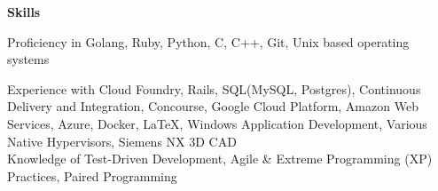 \documentclass[10pt,a4papaer]{article}
\begin{document}
{		\setlength{\leftskip}{0pt}
		
		{\noindent\textbf{Skills}}\vspace*{-20px}\\
		
		\noindent\makebox[\linewidth]{\rule{\textwidth}{1.3pt}}
		
		Proficiency in Golang, Ruby, Python, C, C++, Git, Unix based operating systems\\
		
		\setlength{\leftskip}{15pt}
		
		{\noindent Experience with Cloud Foundry, Rails, SQL(MySQL, Postgres), Continuous Delivery and Integration, Concourse, Google Cloud Platform, Amazon Web Services, Azure, Docker, \LaTeX, Windows Application Development, Various Native Hypervisors, Siemens NX 3D CAD}\\
		
		{\noindent Knowledge of Test-Driven Development, Agile \& Extreme Programming (XP) Practices, Paired Programming\\}
		
		\setlength{\leftskip}{0pt}
		
		
		
	}
\end{document}
